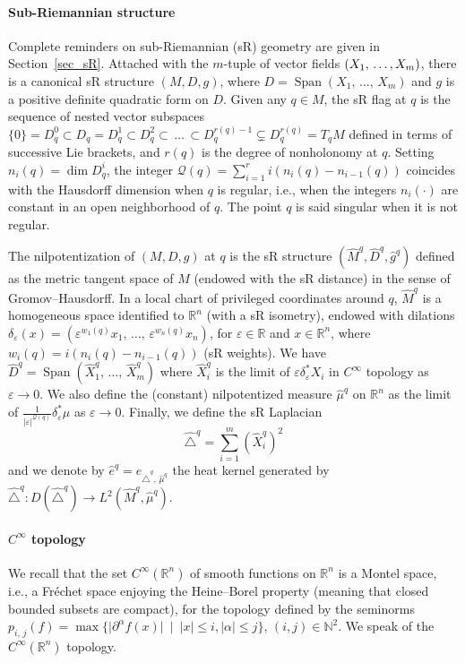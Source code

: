 \documentclass[10pt]{amsart}
\theoremstyle{definition}\newtheorem{defi}[theo]{Definition}\newtheorem{rema}[theo]{Remark}\newtheorem{exam}[theo]{Example}\newtheorem{exem}[theo]{Example}\newtheorem{nota}[theo]{Notation}
\newcommand*\R{\mathbb{R}}
\newcommand*\N{\mathbb{N}}
\newcommand{\calQ}{\mathcal{Q}}
\DeclareMathOperator{\Span}{Span}
\renewcommand{\leq}{\leqslant}
\begin{document}
\paragraph{Sub-Riemannian structure}
Complete reminders on sub-Riemannian (sR) geometry are given in Section~\ref{sec_sR}. Attached with the $m$-tuple of vector fields $(X_1,\,\ldots,\linebreak X_m)$, there is a canonical sR structure $(M,D,g)$, where $D=\Span(X_1,\,\ldots,\,X_m)$ and $g$ is a positive definite quadratic form on $D$. Given any $q\in M$, the sR flag at $q$ is the sequence of nested vector subspaces $\{0\}=D^0_q\subset D_q=D^1_q\subset D^2_q\subset\,\ldots\,\subset D^{r(q)-1}_q\subsetneq D^{r(q)}_q=T_qM$ defined in terms of successive Lie brackets, and $r(q)$ is the degree of nonholonomy at $q$. Setting $n_i(q) = \dim D^i_q$, the integer $\calQ(q) = \sum_{i=1}^r i (n_i(q)-n_{i-1}(q))$ coincides with the Hausdorff dimension when $q$ is regular, i.e., when the integers $n_i(\cdot)$ are constant in an open neighborhood of $q$. The point $q$ is said singular when it is not regular.

The nilpotentization of $(M,D,g)$ at $q$ is the sR structure $(\widehat{M}^{q},\widehat{D}^{q},\widehat{g}^{q})$ defined as the metric tangent space of $M$ (endowed with the sR distance) in the sense of Gromov--Hausdorff. In a local chart of privileged coordinates around $q$, $\widehat{M}^{q}$ is a homogeneous space identified to $\R^n$ (with a sR isometry), endowed with dilations $\delta_\varepsilon(x) = (\varepsilon^{w_1(q)} x_1,\,\ldots,\, \varepsilon^{w_n(q)} x_n )$, for $\varepsilon\in\R$ and $x\in\R^n$, where $w_i(q)=i(n_i(q)-n_{i-1}(q))$ (sR weights). We have $\widehat{D}^{q}=\Span(\widehat{X}_1^{q},\,\ldots,\,\widehat{X}_m^{q})$ where $\widehat{X}_i^{q}$ is the limit of $\varepsilon\delta_\varepsilon^*X_i$ in $C^\infty$ topology as $\varepsilon\rightarrow 0$. We also define the (constant) nilpotentized measure $\widehat{\mu}^{q}$ on $\R^n$ as the limit of $\frac{1}{\vert\varepsilon\vert^{\calQ(q)}} \delta_\varepsilon^* \mu$ as $\varepsilon\rightarrow 0$. Finally, we define the sR Laplacian
\[
\widehat{\triangle}^{q} = \sum_{i=1}^m (\widehat{X}^{q}_i)^2
\]
and we denote by $\widehat{e}^{q} = e_{\widehat{\triangle}^{q},\,\widehat{\mu}^{q}}$ the heat kernel generated by $\widehat{\triangle}^{q}:D(\widehat{\triangle}^{q})\rightarrow L^2(\widehat M^{q},\widehat\mu^{q})$.

\goodbreak
\paragraph{$C^\infty$ topology}
We recall that the set $C^\infty(\R^n)$ of smooth functions on $\R^n$ is a Montel space, i.e., a Fréchet space enjoying the Heine--Borel property (meaning that closed bounded subsets are compact), for the topology defined by the seminorms $p_{i,\,j}(f) = \max \{ \vert \partial^\alpha f(x)\vert\ \mid\ \vert x\vert\leq i, \vert\alpha\vert\leq j\}$, $(i,j)\in\N^2$. We speak of the $C^\infty(\R^n)$ topology.
\end{document}
